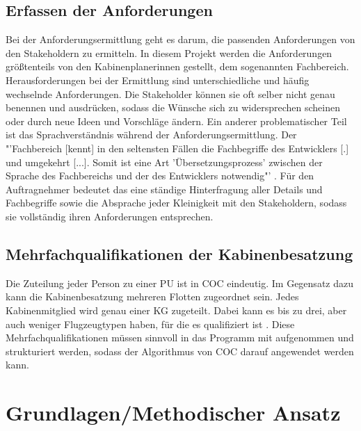 \documentclass [12pt, a4paper, oneside, titlepage, ngerman]{article}
\begin{document}
\subsection{Erfassen der Anforderungen} \label{anforderungen}
Bei der Anforderungsermittlung geht es darum, die passenden Anforderungen von den Stakeholdern zu ermitteln. In diesem Projekt werden die Anforderungen größtenteils von den Kabinenplanerinnen gestellt, dem sogenannten Fachbereich. \\
Herausforderungen bei der Ermittlung sind unterschiedliche und häufig wechselnde Anforderungen. Die Stakeholder können sie oft selber nicht genau benennen und ausdrücken, sodass die Wünsche sich zu widersprechen scheinen oder durch neue Ideen und Vorschläge ändern.%
Ein anderer problematischer Teil ist das Sprachverständnis während der Anforderungsermittlung. Der "'Fachbereich [kennt] in den seltensten Fällen die Fachbegriffe des Entwicklers [.] und umgekehrt [...]. Somit ist eine Art 'Übersetzungsprozess' zwischen der Sprache des Fachbereichs und der des Entwicklers notwendig"' \cite[S.319]{Alpar2016} . 
Für den Auftragnehmer bedeutet das eine ständige Hinterfragung aller Details und Fachbegriffe sowie die Absprache jeder Kleinigkeit mit den Stakeholdern, sodass sie vollständig ihren Anforderungen entsprechen. \\



\subsection{Mehrfachqualifikationen der Kabinenbesatzung}
Die Zuteilung jeder Person zu einer \ac{PU} ist in \ac{COC} eindeutig.
Im Gegensatz dazu kann die Kabinenbesatzung mehreren Flotten zugeordnet sein. Jedes Kabinenmitglied wird genau einer \ac{KG} zugeteilt. Dabei kann es bis zu drei, aber auch weniger Flugzeugtypen haben, für die es qualifiziert ist \cite[vgl.][]{Gespraech2}. Diese Mehrfachqualifikationen müssen sinnvoll in das Programm mit aufgenommen und strukturiert werden, sodass der Algorithmus von \ac{COC} darauf angewendet werden kann.

\newpage

\section {Grundlagen/Methodischer Ansatz}
\end{document}
